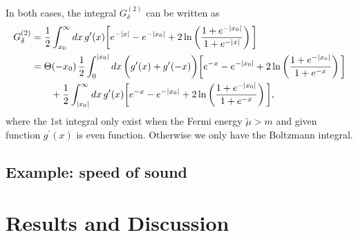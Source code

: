 \documentclass[sn-mathphys,Numbered]{sn-jnl}
\theoremstyle{thmstyleone}%
\theoremstyle{thmstyletwo}%
\theoremstyle{thmstylethree}%
\begin{document}
In both cases, the integral $G^{(2)}_\delta$ can be written as
\begin{align}
G^{(2)}_\delta&=\frac{1}{2}\int^\infty_{x_0}dx\,g^\prime(x)\bigg[e^{-|x|}-e^{-|x_0|}+2\ln\left(\frac{1+e^{-|x_0|}}{1+e^{-|x|}}\right)\bigg]\notag\\
&=\Theta(-x_0)\,\frac{1}{2}\int^{|x_0|}_0dx\,\bigg(g^\prime(x)+g^\prime(-x)\bigg)\bigg[e^{-x}-e^{-|x_0|}+2\ln\left(\frac{1+e^{-|x_0|}}{1+e^{-x}}\right)\bigg]\notag\\
&\qquad+\frac{1}{2}\int^\infty_{|x_0|}dx\,g^\prime(x)\bigg[e^{-x}-e^{-|x_0|}+2\ln\left(\frac{1+e^{-|x_0|}}{1+e^{-x}}\right)\bigg],
\end{align}
where the $1$st integral only exist when the Fermi energy $\tilde\mu>m$ and given function $g^\prime(x)$ is even function. Otherwise we only have the Boltzmann integral.

\subsection{Example: speed of sound}








\section{Results and Discussion}\label{sec12}

 

\backmatter
\end{document}
